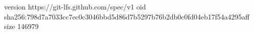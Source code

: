 version https://git-lfs.github.com/spec/v1
oid sha256:798d7a7033cc7ec0c3046bbd5d86d7b5297b76b2db0c0fd04eb17f54a4295aff
size 146979
